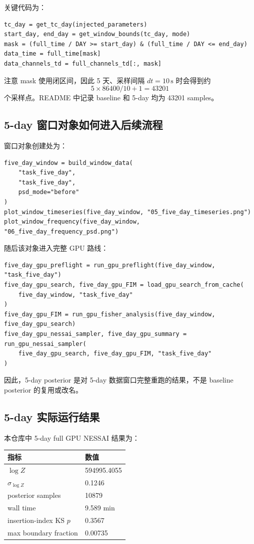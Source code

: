 \documentclass[11pt,a4paper]{ctexart}
\begin{document}
关键代码为：
\begin{lstlisting}[style=pycode]
tc_day = get_tc_day(injected_parameters)
start_day, end_day = get_window_bounds(tc_day, mode)
mask = (full_time / DAY >= start_day) & (full_time / DAY <= end_day)
data_time = full_time[mask]
data_channels_td = full_channels_td[:, mask]
\end{lstlisting}

注意 mask 使用闭区间，因此 5 天、采样间隔 \(dt=10\,\mathrm{s}\) 时会得到约
\[
5\times86400/10+1=43201
\]
个采样点。README 中记录 baseline 和 5-day 均为 43201 samples。

\subsection{5-day 窗口对象如何进入后续流程}

窗口对象创建处为：
\begin{lstlisting}[style=pycode]
five_day_window = build_window_data(
    "task_five_day",
    "task_five_day",
    psd_mode="before"
)
plot_window_timeseries(five_day_window, "05_five_day_timeseries.png")
plot_window_frequency(five_day_window, "06_five_day_frequency_psd.png")
\end{lstlisting}

随后该对象进入完整 GPU 路线：
\begin{lstlisting}[style=pycode]
five_day_gpu_preflight = run_gpu_preflight(five_day_window, "task_five_day")
five_day_gpu_search, five_day_gpu_FIM = load_gpu_search_from_cache(
    five_day_window, "task_five_day"
)
five_day_gpu_FIM = run_gpu_fisher_analysis(five_day_window, five_day_gpu_search)
five_day_gpu_nessai_sampler, five_day_gpu_summary = run_gpu_nessai_sampler(
    five_day_gpu_search, five_day_gpu_FIM, "task_five_day"
)
\end{lstlisting}

因此，5-day posterior 是对 5-day 数据窗口完整重跑的结果，不是 baseline posterior 的复用或改名。

\subsection{5-day 实际运行结果}

本仓库中 5-day full GPU NESSAI 结果为：
\begin{center}
\begin{tabular}{ll}
\toprule
指标 & 数值 \\
\midrule
\(\log Z\) & 594995.4055 \\
\(\sigma_{\log Z}\) & 0.1246 \\
posterior samples & 10879 \\
wall time & 9.589 min \\
insertion-index KS \(p\) & 0.3567 \\
max boundary fraction & 0.00735 \\
\bottomrule
\end{tabular}
\end{center}
\end{document}
